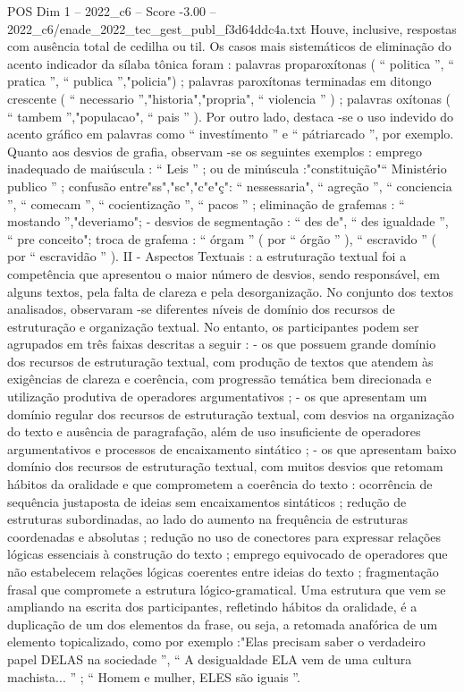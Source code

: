 \begin{textsample}{POS Dim 1 – 2022\_c6 – Score -3.00 – 2022\_c6/enade\_2022\_tec\_gest\_publ\_f3d64ddc4a.txt}
Houve, inclusive, respostas com ausência total de cedilha ou til.
Os casos mais sistemáticos de eliminação do acento indicador da sílaba tônica foram : palavras proparoxítonas ( “ politica ”, “ pratica ”, “ publica ”,"policia") ; palavras paroxítonas terminadas em ditongo crescente ( “ necessario ”,"historia","propria", “ violencia ” ) ; palavras oxítonas ( “ tambem ”,"populacao", “ pais ” ).
Por outro lado, destaca -se o uso indevido do acento gráfico em palavras como “ investímento ” e “ pátriarcado ”, por exemplo.
Quanto aos desvios de grafia, observam -se os seguintes exemplos : emprego inadequado de maiúscula : “ Leis ” ; ou de minúscula :"constituição"“ Ministério publico ” ; confusão entre"ss","sc","c"e"ç": “ nessessaria", “ agreção ”, “ conciencia ”, “ comecam ”, “ cocientização ”, “ pacos ” ; eliminação de grafemas : “ mostando ”,"deveriamo"; - desvios de segmentação : “ des de", “ des igualdade ”, “ pre conceito"; troca de grafema : “ órgam ” ( por “ órgão ” ), “ escravido ” ( por “ escravidão ” ).
II - Aspectos Textuais : a estruturação textual foi a competência que apresentou o maior número de desvios, sendo responsável, em alguns textos, pela falta de clareza e pela desorganização.
No conjunto dos textos analisados, observaram -se diferentes níveis de domínio dos recursos de estruturação e organização textual.
No entanto, os participantes podem ser agrupados em três faixas descritas a seguir : - os que possuem grande domínio dos recursos de estruturação textual, com produção de textos que atendem às exigências de clareza e coerência, com progressão temática bem direcionada e utilização produtiva de operadores argumentativos ; - os que apresentam um domínio regular dos recursos de estruturação textual, com desvios na organização do texto e ausência de paragrafação, além de uso insuficiente de operadores argumentativos e processos de encaixamento sintático ; - os que apresentam baixo domínio dos recursos de estruturação textual, com muitos desvios que retomam hábitos da oralidade e que comprometem a coerência do texto : ocorrência de sequência justaposta de ideias sem encaixamentos sintáticos ; redução de estruturas subordinadas, ao lado do aumento na frequência de estruturas coordenadas e absolutas ; redução no uso de conectores para expressar relações lógicas essenciais à construção do texto ; emprego equivocado de operadores que não estabelecem relações lógicas coerentes entre ideias do texto ; fragmentação frasal que compromete a estrutura lógico-gramatical.
Uma estrutura que vem se ampliando na escrita dos participantes, refletindo hábitos da oralidade, é a duplicação de um dos elementos da frase, ou seja, a retomada anafórica de um elemento topicalizado, como por exemplo :"Elas precisam saber o verdadeiro papel DELAS na sociedade ”, “ A desigualdade ELA vem de uma cultura machista... ” ; “ Homem e mulher, ELES são iguais ”.

\end{textsample}
